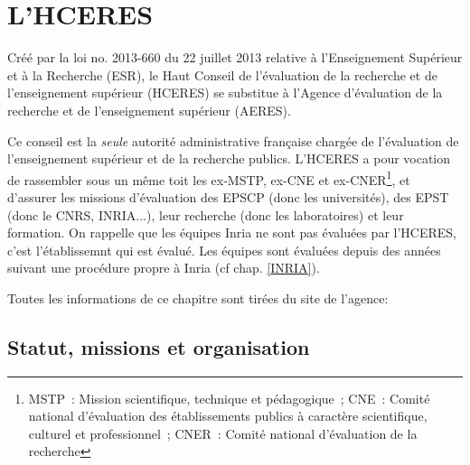 
\chapter[L'HCERES]{L'HCERES} \label{HCERES}


Cr\'e\'e par la loi no. 2013-660 du 22 juillet 2013 relative \`a l'Enseignement Sup\'erieur et \`a la Recherche (ESR), 
le Haut Conseil de l'\'evaluation de la recherche et de l'enseignement sup\'erieur (HCERES) se substitue 
\`a l'Agence d'\'evaluation de la recherche et de l'enseignement sup\'erieur (AERES).

Ce conseil est la {\em seule} autorit\'e administrative fran\c caise
charg\'ee de l'\'evaluation de l'enseignement sup\'erieur et de la recherche publics.
L'HCERES a pour vocation de rassembler sous un m\^eme toit les ex-MSTP, ex-CNE
et ex-CNER\footnote{%
MSTP~: Mission scientifique, technique et p\'edagogique~;
CNE~: Comit\'e national d'\'evaluation
des \'etablissements publics \`a caract\`ere scientifique, culturel et
professionnel~;
CNER~: Comit\'e national d'\'evaluation de la recherche},
et d'assurer les missions d'\'evaluation des EPSCP (donc les universit\'es), des EPST (donc le CNRS, INRIA...),
leur recherche (donc les laboratoires) et leur formation.
On rappelle que les équipes Inria ne sont pas évaluées par l'HCERES, c'est l'établissemnt qui est évalué. 
Les équipes sont évaluées depuis des années suivant une procédure propre à Inria (cf chap. \ref{INRIA}). 

Toutes les informations de ce chapitre sont tir\'ees du site de l'agence: 


\section{Statut, missions et organisation}

